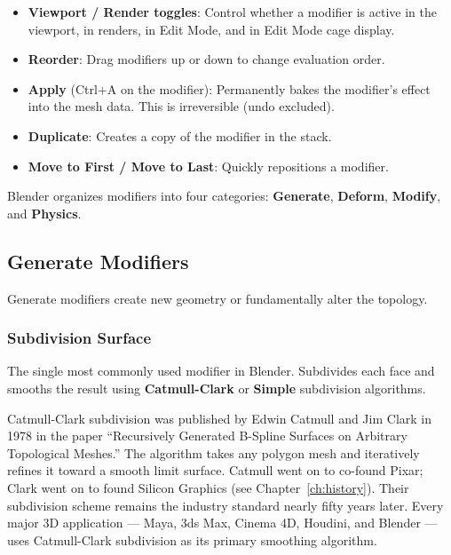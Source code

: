 \begin{itemize}[leftmargin=2em]
  \item \textbf{Viewport / Render toggles}: Control whether a modifier is active in the viewport, in renders, in Edit Mode, and in Edit Mode cage display.
  \item \textbf{Reorder}: Drag modifiers up or down to change evaluation order.
  \item \textbf{Apply} (Ctrl+A on the modifier): Permanently bakes the modifier's effect into the mesh data. This is irreversible (undo excluded).
  \item \textbf{Duplicate}: Creates a copy of the modifier in the stack.
  \item \textbf{Move to First / Move to Last}: Quickly repositions a modifier.
\end{itemize}

Blender organizes modifiers into four categories: \textbf{Generate}, \textbf{Deform}, \textbf{Modify}, and \textbf{Physics}.

\subsection{Generate Modifiers}
\label{sec:generatemod}

Generate modifiers create new geometry or fundamentally alter the topology.

\subsubsection{Subdivision Surface}
\label{sec:subdiv}

The single most commonly used modifier in Blender. Subdivides each face and smooths the result using \textbf{Catmull-Clark} or \textbf{Simple} subdivision algorithms.

\begin{historynote}
Catmull-Clark subdivision was published by Edwin Catmull and Jim Clark in 1978 in the paper ``Recursively Generated B-Spline Surfaces on Arbitrary Topological Meshes.'' The algorithm takes any polygon mesh and iteratively refines it toward a smooth limit surface. Catmull went on to co-found Pixar; Clark went on to found Silicon Graphics (see Chapter~\ref{ch:history}). Their subdivision scheme remains the industry standard nearly fifty years later. Every major 3D application --- Maya, 3ds Max, Cinema 4D, Houdini, and Blender --- uses Catmull-Clark subdivision as its primary smoothing algorithm.
\end{historynote}

